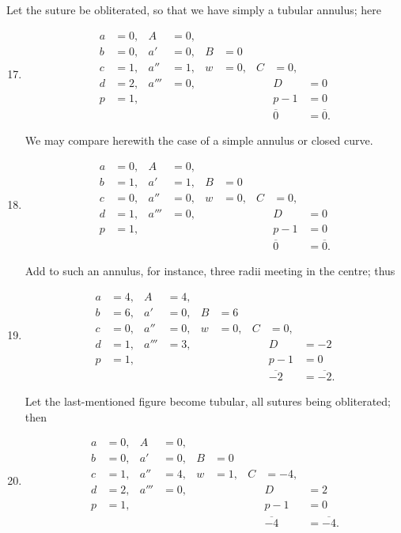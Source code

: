 \documentclass[11pt,a4paper]{book}
\begin{document}
\clearpage

Let the suture be obliterated, so that we have simply a tubular annulus; here

\begin{enumerate}
\setcounter{enumi}{16}
\item
\begin{align*}
a &= 0, & A &= 0, \\
b &= 0, & a' &= 0, & B &= 0 \\
c &= 1, & a'' &= 1, & w &= 0, & C &= 0, \\
d &= 2, & a''' &= 0, & & & & D &= 0 \\
p &= 1, & & & & & & p - 1 &= 0 \\[2pt]
& & & & & & & \overline{0} &= \overline{0}.
\end{align*}

We may compare herewith the case of a simple annulus or closed curve.

\item
\begin{align*}
a &= 0, & A &= 0, \\
b &= 1, & a' &= 1, & B &= 0 \\
c &= 0, & a'' &= 0, & w &= 0, & C &= 0, \\
d &= 1, & a''' &= 0, & & & & D &= 0 \\
p &= 1, & & & & & & p - 1 &= 0 \\[2pt]
& & & & & & & \overline{0} &= \overline{0}.
\end{align*}

Add to such an annulus, for instance, three radii meeting in the centre; thus

\item
\begin{align*}
a &= 4, & A &= 4, \\
b &= 6, & a' &= 0, & B &= 6 \\
c &= 0, & a'' &= 0, & w &= 0, & C &= 0, \\
d &= 1, & a''' &= 3, & & & & D &= -2 \\
p &= 1, & & & & & & p - 1 &= 0 \\[2pt]
& & & & & & & \overline{-2} &= \overline{-2}.
\end{align*}

Let the last-mentioned figure become tubular, all sutures being obliterated; then

\item
\begin{align*}
a &= 0, & A &= 0, \\
b &= 0, & a' &= 0, & B &= 0 \\
c &= 1, & a'' &= 4, & w &= 1, & C &= -4, \\
d &= 2, & a''' &= 0, & & & & D &= 2 \\
p &= 1, & & & & & & p - 1 &= 0 \\[2pt]
& & & & & & & \overline{-4} &= \overline{-4}.
\end{align*}


\end{enumerate}
\end{document}
